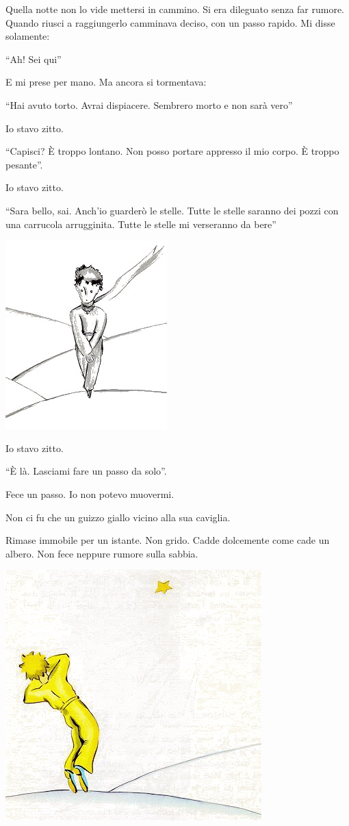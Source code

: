 \documentclass[11pt]{scrbook}
\begin{document}
Quella notte non lo vide mettersi in cammino. Si era dileguato senza far
rumore. Quando riusci a raggiungerlo camminava deciso, con un passo
rapido. Mi disse solamente:

``Ah! Sei qui''

E mi prese per mano. Ma ancora si tormentava:

``Hai avuto torto. Avrai dispiacere. Sembrero morto e non sarà vero''

Io stavo zitto.

``Capisci? È troppo lontano. Non posso portare appresso il mio corpo. È troppo pesante''.

Io stavo zitto.

``Sara bello, sai. Anch'io guarderò le stelle. Tutte le stelle saranno dei pozzi con una carrucola arrugginita. Tutte le stelle mi verseranno da bere''

\begin{center}
\includegraphics{img/26c}
\end{center}

Io stavo zitto.

``È là. Lasciami fare un passo da solo''.

Fece un passo. Io non potevo muovermi.

Non ci fu che un guizzo giallo vicino alla sua caviglia.

Rimase immobile per un istante. Non grido. Cadde dolcemente come cade un
albero. Non fece neppure rumore sulla sabbia.

\begin{center}
\includegraphics{img/zlaty}
\end{center}
\end{document}
